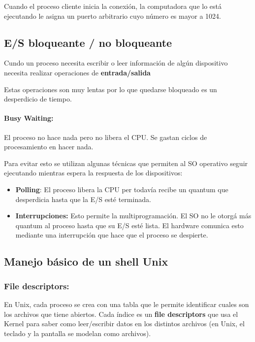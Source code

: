 Cuando el proceso cliente inicia la conexión, la computadora que lo está ejecutando le asigna un puerto arbitrario cuyo número es mayor a 1024.
\subsubsection{}

\subsection{E/S bloqueante / no bloqueante}
	Cundo un proceso necesita escribir o leer información de algún dispositivo necesita realizar operaciones de \textbf{entrada/salida}

	Estas operaciones son muy lentas por lo que quedarse bloqueado es un desperdicio de tiempo.

	\paragraph{Busy Waiting:} El proceso no hace nada pero no libera el CPU. Se gastan ciclos de procesamiento en hacer nada.

	Para evitar esto se utilizan algunas técnicas que permiten al SO operativo seguir ejecutando mientras espera la respuesta de los dispositivos:

	\begin{itemize}
		\item \textbf{Polling}: El proceso libera la CPU per todavía recibe un quantum que desperdicia hasta que la E/S esté terminada.
		\item \textbf{Interrupciones:} Esto permite la multiprogramación. El SO no le otorgá más quantum al proceso hasta que su E/S esté lista. El hardware comunica esto mediante una interrupción que hace que el proceso se despierte.
	\end{itemize}

	\subsection{Manejo básico de un shell Unix}
\subsubsection{File descriptors:}
	En Unix, cada proceso se crea con una tabla que le permite identificar cuales son los archivos que tiene abiertos. Cada índice es un \textbf{file descriptors} que usa el Kernel para saber como leer/escribir datos en los distintos archivos (en Unix, el teclado y la pantalla se modelan como archivos).
	
